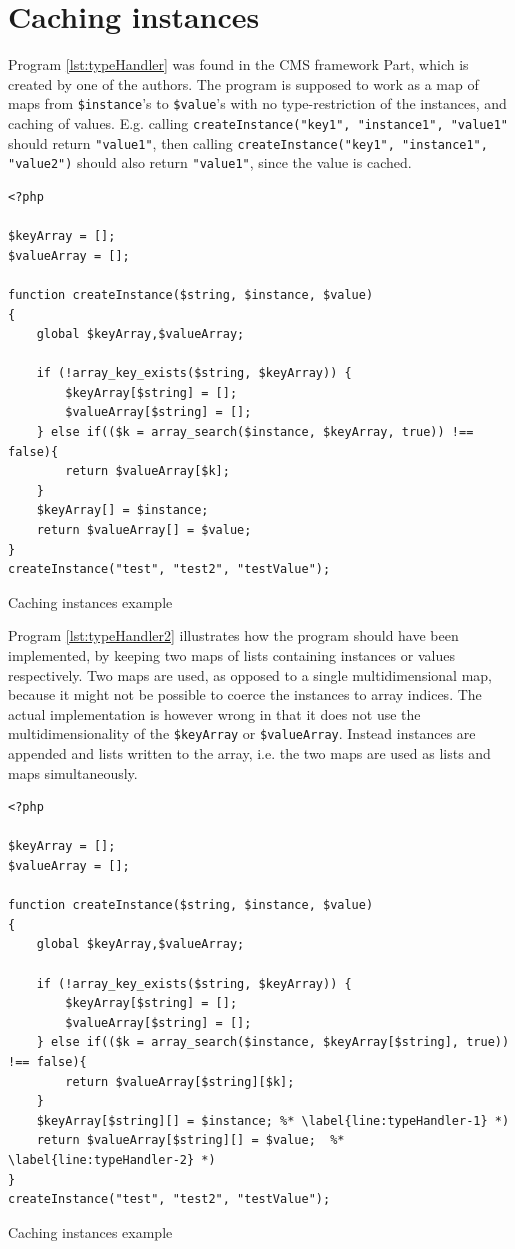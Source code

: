 \newpage
\section{Caching instances}
Program \ref{lst:typeHandler} was found in the CMS framework Part, which is created by one of the authors. The program is supposed to work as a map of maps from \texttt{\$instance}'s to \texttt{\$value}'s with no type-restriction of the instances, and caching of values. E.g. calling \texttt{createInstance("key1", "instance1", "value1"}  should return \texttt{"value1"}, then calling \texttt{createInstance("key1", "instance1", "value2")} should also return \texttt{"value1"}, since the value is cached.

\begin{program}
\begin{lstlisting}
<?php

$keyArray = [];
$valueArray = [];

function createInstance($string, $instance, $value)
{
    global $keyArray,$valueArray;

    if (!array_key_exists($string, $keyArray)) {
        $keyArray[$string] = [];
        $valueArray[$string] = [];
    } else if(($k = array_search($instance, $keyArray, true)) !== false){
        return $valueArray[$k];
    }
    $keyArray[] = $instance;
    return $valueArray[] = $value;
}
createInstance("test", "test2", "testValue");
\end{lstlisting}
\caption{Caching instances example}
\label{lst:typeHandler}
\end{program}



Program \ref{lst:typeHandler2} illustrates how the program should have been implemented, by keeping two maps of lists containing instances or values respectively. Two maps are used, as opposed to a single multidimensional map, because it might not be possible to coerce the instances to array indices. The actual implementation is however wrong in that it does not use the multidimensionality of the \texttt{\$keyArray} or \texttt{\$valueArray}. Instead instances are appended and lists written to the array, i.e. the two maps are used as lists and maps simultaneously. 



\begin{program}
\begin{lstlisting}
<?php

$keyArray = [];
$valueArray = [];

function createInstance($string, $instance, $value)
{
    global $keyArray,$valueArray;

    if (!array_key_exists($string, $keyArray)) {
        $keyArray[$string] = [];
        $valueArray[$string] = [];
    } else if(($k = array_search($instance, $keyArray[$string], true)) !== false){
        return $valueArray[$string][$k];
    }
    $keyArray[$string][] = $instance; %* \label{line:typeHandler-1} *)
    return $valueArray[$string][] = $value;  %* \label{line:typeHandler-2} *)
}
createInstance("test", "test2", "testValue");
\end{lstlisting}
\caption{Caching instances example}
\label{lst:typeHandler2}
\end{program}


